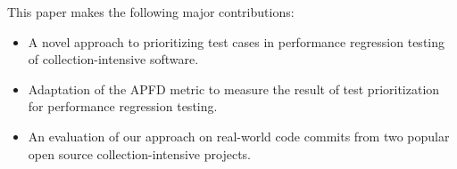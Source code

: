 This paper makes the following major contributions:
  \vspace{-0.1cm}
\begin{itemize}
  \item A novel approach to prioritizing test cases in performance regression testing of collection-intensive software.
  
  
  
    
    
  \item Adaptation of the APFD metric to measure the result of test prioritization for performance regression testing. 
    
  \item An evaluation of our approach on real-world code commits from two popular open source collection-intensive projects. 
  
\end{itemize}
  
  
